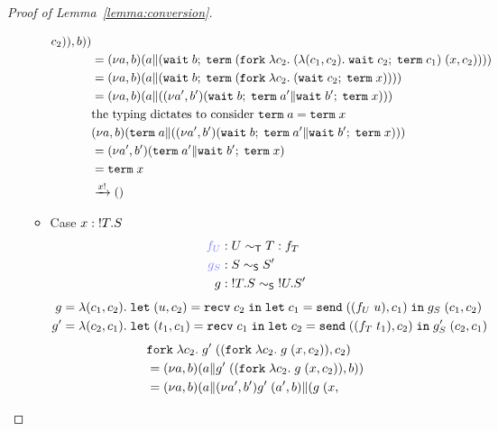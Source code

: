 \begin{proof}[Proof of Lemma~\ref{lemma:conversion}]
\begin{enumerate}
\begin{itemize}
\begin{align*}
{{        c_2) }), b)}) \\
        &=
          \PScope
          (\PPar a {(\ELetU {\EWait {b}} {\ETerm {(\EFork{ \ELam {c_2} (\ELam {(c_1, c_2)} \ELetU {\EWait {c_2}} {\ETerm {c_1}}) \; (x,
        c_2) })}})}) \\
        &=
          \PScope
          (\PPar a {(\ELetU {\EWait {b}} {\ETerm {(\EFork{ \ELam {c_2} (\ELetU {\EWait {c_2}} {\ETerm {x}}) })}})}) \\
        &=
          \PScope
          (\PPar a {(\PScope[a',b'] \PPar {(\ELetU {\EWait {b}} {\ETerm
          {a'}}} {{ \ELetU {\EWait {b'}} {\ETerm {x}}) }})}) \\
        & \text{the typing dictates to consider }\ETerm a = \ETerm x \\
        & \PScope (\PPar {\ETerm a} {(\PScope[a',b'] \PPar {(\ELetU {\EWait {b}} {\ETerm
          {a'}}} {{ \ELetU {\EWait {b'}} {\ETerm {x}}) }})}) \\
        &=\PScope[a',b'] \PPar {({\ETerm
          {a'}}} {{ \ELetU {\EWait {b'}} {\ETerm {x}}) }} \\
        &=  \ETerm {x} \\
        &\reduce[x!]{} \EUnit
      \end{align*}
    \item Case $x : {}!T.S$
      \begin{align*}
      \textcolor{blue!50} {f_U} &: U \eqt T : f_T  \\
        \textcolor{blue!50} {g_S} & : S \eqs S' \\ %
        g &: \TOut {T} {S} \eqs \TOut {U} {S'}
      \end{align*}
      \begin{align*}
        g & = \lambda (c_1, c_2).\;
          \mathtt{let}\; (u,c_2) = \mathtt{recv}\; c_2 \;\mathtt{in}\; 
        \mathtt{let}\; c_1 = \mathtt{send}\; ((f_U \; u),c_1) \;\mathtt{in}\; 
        g_S \; (c_1, c_2)
        \\
        g' &= 
        \lambda (c_2, c_1).\;
        \mathtt{let}\; (t_1,c_1) = \mathtt{recv}\; c_1 \;\mathtt{in}\;
        \mathtt{let}\; c_2 = \mathtt{send}\; ((f_T \; t_1),c_2) \;\mathtt{in}\;
        g'_S \; (c_2, c_1)
      \end{align*}
\begin{align*}
        & 
        \EFork{ \ELam {c_2} g' \; ((\EFork{ \ELam {c_2} g \; (x,
        c_2) }), c_2)} \\
        &= \PScope ({\PPar a g' \; ((\EFork{ \ELam {c_2} g \; (x,
        c_2) }), b)})  \\
        &= \PScope ({\PPar a {\PScope[a',b'] \PPar {g' \; (a', b)} {({ g \; (x,
}}}}
\end{align*}
\end{itemize}
\end{enumerate}
\end{proof}
